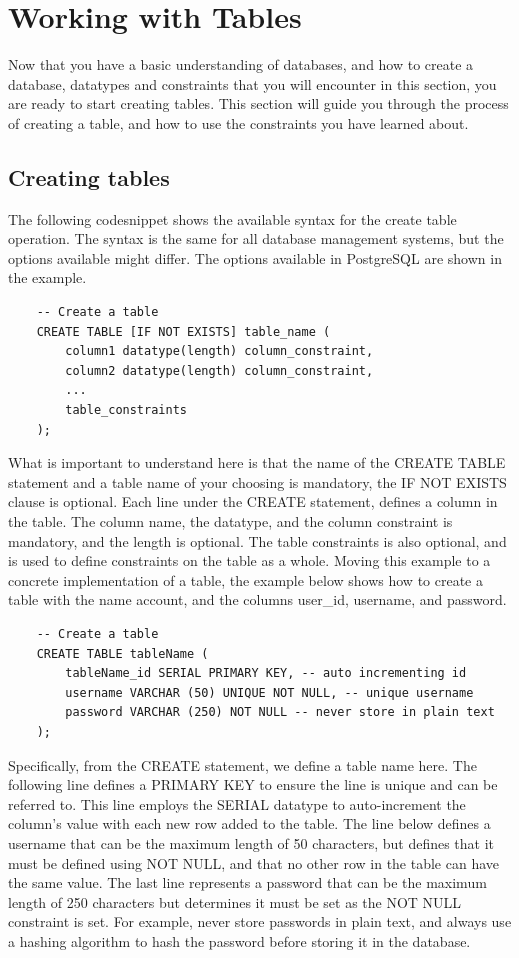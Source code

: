 \section{Working with Tables}
Now that you have a basic understanding of databases, and how to create a database, datatypes and constraints that you will encounter in this section, you are ready to start creating tables. This section will guide you through the process of creating a table, and how to use the constraints you have learned about.

\subsection{Creating tables}
The following codesnippet shows the available syntax for the create table operation. The syntax is the same for all database management systems, but the options available might differ. The options available in PostgreSQL are shown in the example.

\begin{verbatim}
    -- Create a table
    CREATE TABLE [IF NOT EXISTS] table_name (
        column1 datatype(length) column_constraint,
        column2 datatype(length) column_constraint,
        ...
        table_constraints
    );
\end{verbatim}

What is important to understand here is that the name of the CREATE TABLE statement and a table name of your choosing is mandatory, the IF NOT EXISTS clause is optional. Each line under the CREATE statement, defines a column in the table. The column name, the datatype, and the column constraint is mandatory, and the length is optional. The table constraints is also optional, and is used to define constraints on the table as a whole. Moving this example to a concrete implementation of a table, the example below shows how to create a table with the name account, and the columns user\_id, username, and password.

\begin{verbatim}
    -- Create a table
    CREATE TABLE tableName (
        tableName_id SERIAL PRIMARY KEY, -- auto incrementing id
        username VARCHAR (50) UNIQUE NOT NULL, -- unique username
        password VARCHAR (250) NOT NULL -- never store in plain text
    );
\end{verbatim}

Specifically, from the CREATE statement, we define a table name here. The following line defines a PRIMARY KEY to ensure the line is unique and can be referred to. This line employs the SERIAL datatype to auto-increment the column's value with each new row added to the table. The line below defines a username that can be the maximum length of 50 characters, but defines that it must be defined using NOT NULL, and that no other row in the table can have the same value. The last line represents a password that can be the maximum length of 250 characters but determines it must be set as the NOT NULL constraint is set. For example, never store passwords in plain text, and always use a hashing algorithm to hash the password before storing it in the database.


